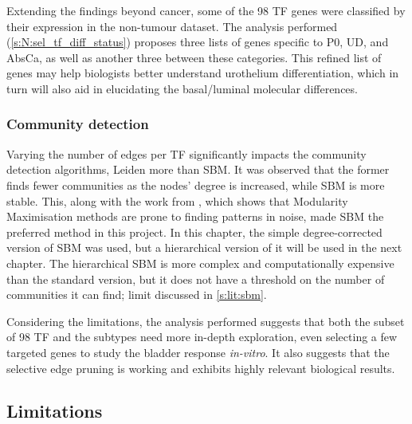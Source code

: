 Extending the findings beyond cancer, some of the 98 TF genes were classified by their expression in the non-tumour dataset. The analysis performed (\cref{s:N:sel_tf_diff_status}) proposes three lists of genes specific to P0, UD, and AbsCa, as well as another three between these categories. This refined list of genes may help biologists better understand urothelium differentiation, which in turn will also aid in elucidating the basal/luminal molecular differences.


\subsubsection*{Community detection}

Varying the number of edges per TF significantly impacts the community detection algorithms, Leiden more than SBM. It was observed that the former finds fewer communities as the nodes' degree is increased, while SBM is more stable. This, along with the work from \citet{Peixoto2021-jx, Peixoto2023-rt}, which shows that Modularity Maximisation methods are prone to finding patterns in noise, made SBM the preferred method in this project. In this chapter, the simple degree-corrected version of SBM was used, but a hierarchical version of it will be used in the next chapter. The hierarchical SBM is more complex and computationally expensive than the standard version, but it does not have a threshold on the number of communities it can find; limit discussed in \cref{s:lit:sbm}.


Considering the limitations, the analysis performed suggests that both the subset of 98 TF and the subtypes need more in-depth exploration, even selecting a few targeted genes to study the bladder response \textit{in-vitro}. It also suggests that the selective edge pruning is working and exhibits highly relevant biological results.

\subsection* {Limitations}

